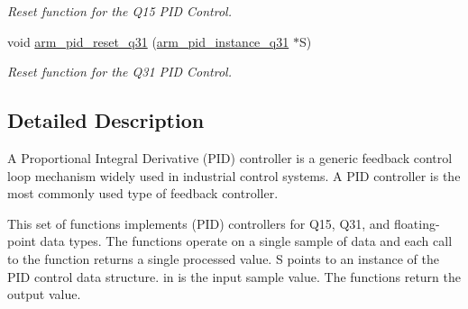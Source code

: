 \begin{DoxyCompactItemize}
\begin{DoxyCompactList}\small\item\em Reset function for the Q15 P\-I\-D Control. \end{DoxyCompactList}\item 
void \hyperlink{group___p_i_d_gaeecbacd3fb37c608ec25474d3a0dffa9}{arm\-\_\-pid\-\_\-reset\-\_\-q31} (\hyperlink{structarm__pid__instance__q31}{arm\-\_\-pid\-\_\-instance\-\_\-q31} $\ast$S)
\begin{DoxyCompactList}\small\item\em Reset function for the Q31 P\-I\-D Control. \end{DoxyCompactList}\end{DoxyCompactItemize}


\subsection{Detailed Description}
A Proportional Integral Derivative (P\-I\-D) controller is a generic feedback control loop mechanism widely used in industrial control systems. A P\-I\-D controller is the most commonly used type of feedback controller.

This set of functions implements (P\-I\-D) controllers for Q15, Q31, and floating-\/point data types. The functions operate on a single sample of data and each call to the function returns a single processed value. {\ttfamily S} points to an instance of the P\-I\-D control data structure. {\ttfamily in} is the input sample value. The functions return the output value.

